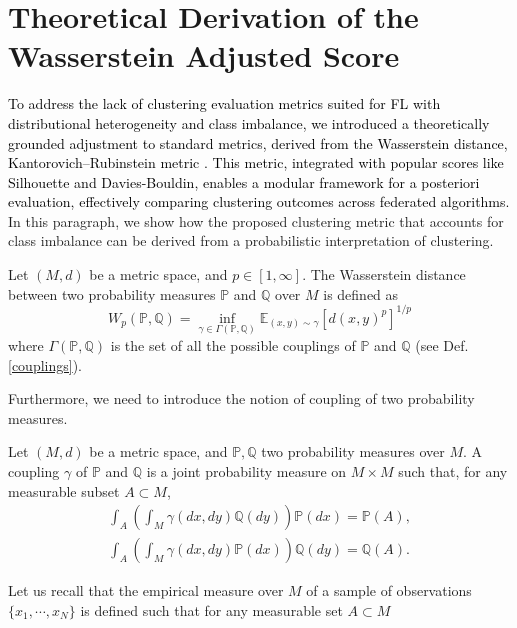 \section{Theoretical Derivation of the Wasserstein Adjusted Score} \label{app:clustering}
\textcolor{black}{To address the lack of clustering evaluation metrics suited for FL with distributional heterogeneity and class imbalance, we introduced a theoretically grounded adjustment to standard metrics, derived from the Wasserstein distance, Kantorovich–Rubinstein metric \citep{kantorovich1942translocation}. This metric, integrated with popular scores like Silhouette and Davies-Bouldin, enables a modular framework for a posteriori evaluation, effectively comparing clustering outcomes across federated algorithms.}
In this paragraph, we show how the proposed clustering metric that accounts for class imbalance can be derived from a probabilistic interpretation of clustering. 
\begin{definition}
    Let $(M,d)$ be a metric space, and $p \in [1,\infty]$. The Wasserstein distance between two probability measures $\mathbb{P}$ and $\mathbb{Q}$ over $M$ is defined as
    \begin{equation}\label{eq:wass}
        W_p(\mathbb{P}, \mathbb{Q}) =  \inf_{\gamma \in \Gamma(\mathbb{P}, \mathbb{Q})} \mathbb{E}_{(x,y)\sim \gamma}[d(x,y)^p]^{1/p}
    \end{equation}
where $\Gamma(\mathbb{P}, \mathbb{Q})$ is  the set of all the possible couplings of $\mathbb{P}$ and $\mathbb{Q}$ (see Def. \ref{couplings}).
\end{definition}
Furthermore, we need to introduce the notion of coupling of two probability measures.
\begin{definition}\label{couplings}
Let $(M,d)$ be a metric space, and $\mathbb{P}, \mathbb{Q}$ two probability measures over $M$. A coupling $\gamma$ of $\mathbb{P}$ and $\mathbb{Q}$ is a joint probability measure on $M \times M$ such that, for any measurable subset $A \subset M$,
\begin{equation}\label{eq:coupling}
\begin{split}
    \int_A \left(\int_M \gamma(dx, dy) \mathbb{Q}(dy)\right) \mathbb{P}(dx) = \mathbb{P}(A), \\
    \int_A \left(\int_M \gamma(dx, dy) \mathbb{P}(dx)\right) \mathbb{Q}(dy) = \mathbb{Q}(A).
\end{split}
\end{equation}
\end{definition}
Let us recall that the empirical measure over $M$ of a sample of observations $\{x_1, \cdots, x_N\}$ is defined such that for any measurable  set $A \subset M$
